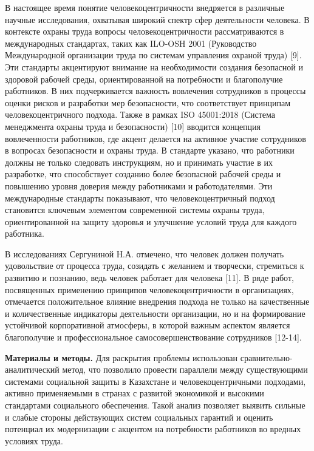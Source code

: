 \begin{multicols}{2}
В настоящее время понятие человекоцентричности внедряется в различные
научные исследования, охватывая широкий спектр сфер деятельности
человека. В контексте охраны труда вопросы человекоцентричности
рассматриваются в международных стандартах, таких как ILO-OSH 2001
(Руководство Международной организации труда по системам управления
охраной труда) {[}9{]}. Эти стандарты акцентируют внимание на
необходимости создания безопасной и здоровой рабочей среды,
ориентированной на потребности и благополучие работников. В них
подчеркивается важность вовлечения сотрудников в процессы оценки рисков
и разработки мер безопасности, что соответствует принципам
человекоцентричного подхода. Также в рамках ISO 45001:2018 (Система
менеджмента охраны труда и безопасности) {[}10{]} вводится концепция
вовлеченности работников, где акцент делается на активное участие
сотрудников в вопросах безопасности и охраны труда. В стандарте указано,
что работники должны не только следовать инструкциям, но и принимать
участие в их разработке, что способствует созданию более безопасной
рабочей среды и повышению уровня доверия между работниками и
работодателями. Эти международные стандарты показывают, что
человекоцентричный подход становится ключевым элементом современной
системы охраны труда, ориентированной на защиту здоровья и улучшение
условий труда для каждого работника.

В исследованиях Сергуниной Н.А. отмечено, что человек должен получать
удовольствие от процесса труда, созидать с желанием и творчески,
стремиться к развитию и познанию, ведь человек работает для человека
{[}11{]}. В ряде работ, посвященных применению принципов
человекоцентричности в организациях, отмечается положительное влияние
внедрения подхода не только на качественные и количественные индикаторы
деятельности организации, но и на формирование устойчивой корпоративной
атмосферы, в которой важным аспектом является благополучие и
профессиональное самосовершенствование сотрудников {[}12-14{]}.

{\bfseries Материалы и методы.} Для раскрытия проблемы использован
сравнительно-аналитический метод, что позволило провести параллели между
существующими системами социальной защиты в Казахстане и
человекоцентричными подходами, активно применяемыми в странах с развитой
экономикой и высокими стандартами социального обеспечения. Такой анализ
позволяет выявить сильные и слабые стороны действующих систем социальных
гарантий и оценить потенциал их модернизации с акцентом на потребности
работников во вредных условиях труда.


\end{multicols}
